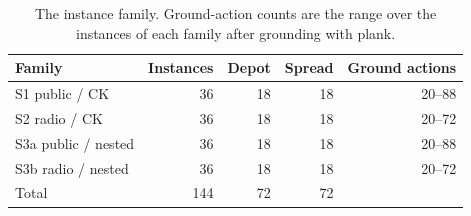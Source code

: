 \begin{table}[H]
\centering
\small
\caption{The instance family. Ground-action counts are the range over the
instances of each family after grounding with \textsf{plank}.}
\label{tab:family}
\begin{tabular}{@{}l r r r r@{}}
\toprule
\textbf{Family} & \textbf{Instances} & \textbf{Depot} & \textbf{Spread} & \textbf{Ground actions} \\
\midrule
S1 public / CK & 36 & 18 & 18 & 20--88 \\
S2 radio / CK & 36 & 18 & 18 & 20--72 \\
S3a public / nested & 36 & 18 & 18 & 20--88 \\
S3b radio / nested & 36 & 18 & 18 & 20--72 \\
\midrule
Total & 144 & 72 & 72 & \\
\bottomrule
\end{tabular}
\end{table}
